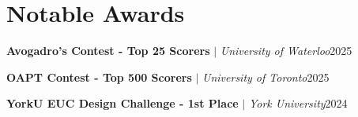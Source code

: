 \section{Notable Awards}
\resumeSubHeadingListStart

    \resumeProjectHeading
    {\textbf{Avogadro's Contest - Top 25 Scorers} $|$ \emph{University of Waterloo}}{2025}

    \resumeProjectHeading
    {\textbf{OAPT Contest - Top 500 Scorers} $|$ \emph{University of Toronto}}{2025}

    \resumeProjectHeading
    {\textbf{YorkU EUC Design Challenge - 1st Place} $|$ \emph{York University}}{2024}

\resumeSubHeadingListEnd
